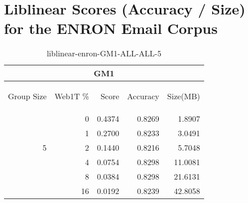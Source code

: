 \chapter{Liblinear Scores (Accuracy / Size) for the ENRON Email Corpus}
\begin{center}
\begin{table}[htbp]
\begin{tabular}{ | r | r | r | r | r |}
\hline
\multicolumn{5}{|c|}{GM1}\\
\hline
\begin{sideways}Group Size\end{sideways} & \begin{sideways}Web1T \%\end{sideways} & \begin{sideways}Score\end{sideways} & \begin{sideways}Accuracy\end{sideways} & \begin{sideways}Size(MB)\end{sideways}\\
\hline
\multirow{5}{*}{5}
 & 0 & 0.4374 & 0.8269 & 1.8907\\ \cline{2-5}
 & 1 & 0.2700 & 0.8233 & 3.0491\\ \cline{2-5}
 & 2 & 0.1440 & 0.8216 & 5.7048\\ \cline{2-5}
 & 4 & 0.0754 & 0.8298 & 11.0081\\ \cline{2-5}
 & 8 & 0.0384 & 0.8298 & 21.6131\\ \cline{2-5}
 & 16 & 0.0192 & 0.8239 & 42.8058\\ \cline{2-5}
\hline
\end{tabular}
\caption{liblinear-enron-GM1-ALL-ALL-5}
\label{table:liblinear-enron-GM1-ALL-ALL-5}
\end{table}
\end{center}

